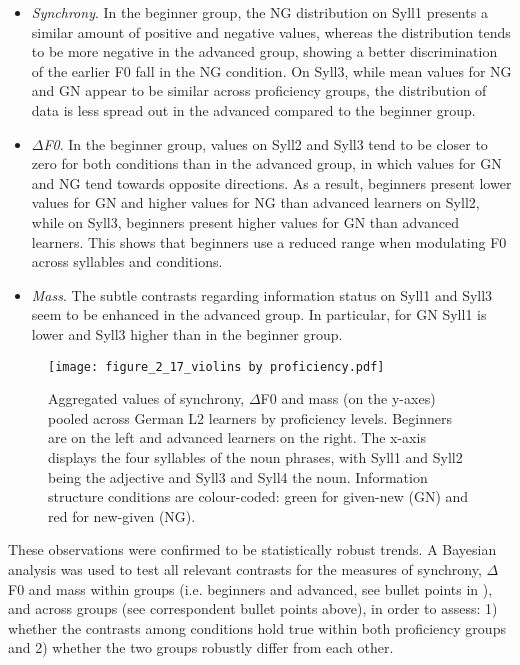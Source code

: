 \begin{itemize}
\item \textit{Synchrony}. In the beginner group, the NG distribution on Syll1 presents a similar amount of positive and negative values, whereas the distribution tends to be more negative in the advanced group, showing a better discrimination of the earlier F0 fall in the NG condition. On Syll3, while mean values for NG and GN appear to be similar across proficiency groups, the distribution of data is less spread out in the advanced compared to the beginner group.
\item \textit{${\Delta}$F0}. In the beginner group, values on Syll2 and Syll3 tend to be closer to zero for both conditions than in the advanced group, in which values for GN and NG tend towards opposite directions. As a result, beginners present lower values for GN and higher values for NG than advanced learners on Syll2, while on Syll3, beginners present higher values for GN than advanced learners. This shows that beginners use a reduced range when modulating F0 across syllables and conditions.
\item \textit{Mass}. The subtle contrasts regarding information status on Syll1 and Syll3 seem to be enhanced in the advanced group. In particular, for GN Syll1 is lower and Syll3 higher than in the beginner group.
\end{itemize}

\begin{figure}
\texttt{[image: figure\_2\_17\_violins by proficiency.pdf]}
\caption{Aggregated values of synchrony, ${\Delta}$F0 and mass (on the y-axes) pooled across German L2 learners by proficiency levels. Beginners are on the left and advanced learners on the right. The x-axis displays the four syllables of the noun phrases, with Syll1 and Syll2 being the adjective and Syll3 and Syll4 the noun. Information structure conditions are colour-coded: green for given-new (GN) and red for new-given (NG).}
\label{fig:2.17}
\end{figure}

These observations were confirmed to be statistically robust trends. A Bayesian analysis was used to test all relevant contrasts for the measures of synchrony, ${\Delta}$F0 and mass within groups (i.e. beginners and advanced, see bullet points in ), and across groups (see correspondent bullet points above), in order to assess: 1) whether the contrasts among conditions hold true within both proficiency groups and 2) whether the two groups robustly differ from each other.

